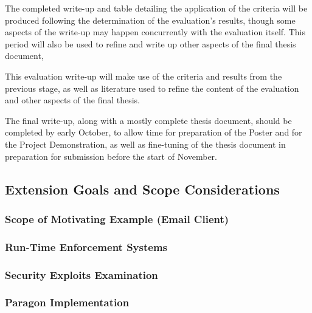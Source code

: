 The completed write-up and table detailing the application of the criteria will be produced following the determination of the evaluation's results, though some aspects of the write-up may happen concurrently with the evaluation itself. This period will also be used to refine and write up other aspects of the final thesis document,

This evaluation write-up will make use of the criteria and results from the previous stage, as well as literature used to refine the content of the evaluation and other aspects of the final thesis.

The final write-up, along with a mostly complete thesis document, should be completed by early October, to allow time for preparation of the Poster and for the Project Demonstration, as well as fine-tuning of the thesis document in preparation for submission before the start of November.

\subsection{Extension Goals and Scope Considerations}
	
	\subsubsection{Scope of Motivating Example (Email Client)}
	
	\subsubsection{Run-Time Enforcement Systems}
	
	\subsubsection{Security Exploits Examination}
	
	\subsubsection{Paragon Implementation}